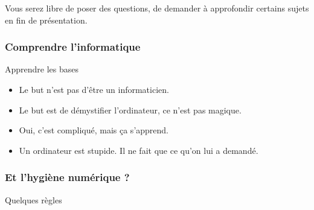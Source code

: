 \documentclass{beamer}
\begin{document}
\begin{frame}
\begin{center}
\Huge{Vous serez libre de poser des questions, de demander à approfondir certains sujets en fin de présentation.}
\end{center}
\end{frame}


\begin{frame}
\frametitle{Comprendre l'informatique}
\begin{block}{Apprendre les bases}
\begin{itemize}
\item Le but n'est pas d'être un informaticien.
\item Le but est de démystifier l'ordinateur, ce n'est pas magique.
\item Oui, c'est compliqué, mais ça s'apprend.
\item Un ordinateur est stupide. Il ne fait que ce qu'on lui a demandé.
\end{itemize}
\end{block}
\end{frame}


\begin{frame}
\frametitle{Et l'hygiène numérique ?}
\begin{block}{}
\end{block}
\end{frame}



\begin{frame}
\begin{center}
\Huge{Quelques règles}
\end{center}
\end{frame}

\end{document}
